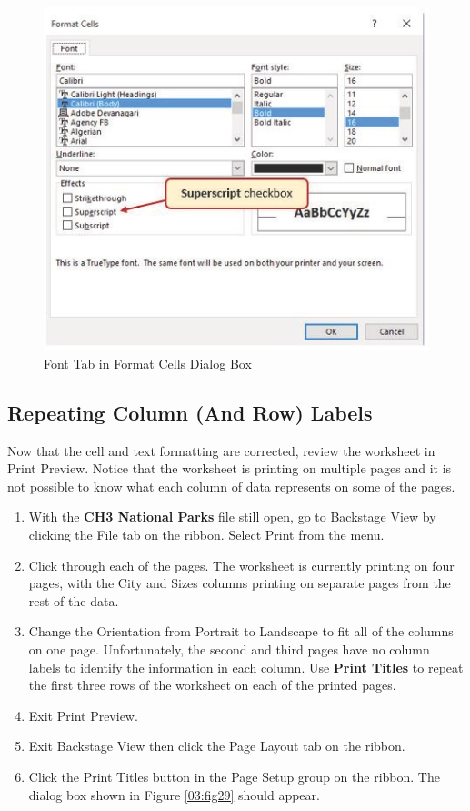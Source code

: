 \begin{figure}[H]
	\centering
	\includegraphics[width=\maxwidth{.95\linewidth}]{gfx/ch03_fig28}
	\caption{Font Tab in Format Cells Dialog Box}
	\label{03:fig28}
\end{figure}

\subsection{Repeating Column (And Row) Labels}

Now that the cell and text formatting are corrected, review the worksheet in Print Preview. Notice that the worksheet is printing on multiple pages and it is not possible to know what each column of data represents on some of the pages.

\begin{enumerate}
	\item With the \textbf{CH3 National Parks} file still open, go to Backstage View by clicking the File tab on the ribbon. Select Print from the menu.
	\item Click through each of the pages. The worksheet is currently printing on four pages, with the City and Sizes columns printing on separate pages from the rest of the data.
	\item Change the Orientation from Portrait to Landscape to fit all of the columns on one page. Unfortunately, the second and third pages have no column labels to identify the information in each column. Use \textbf{Print Titles} to repeat the first three rows of the worksheet on each of the printed pages. 
	\item Exit Print Preview.
	\item Exit Backstage View then click the Page Layout tab on the ribbon.
	\item Click the Print Titles button in the Page Setup group on the ribbon. The dialog box shown in Figure \ref{03:fig29} should appear.
\end{enumerate}

